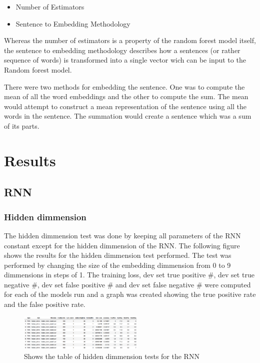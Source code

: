 \documentclass[twoside,twocolumn]{article}
\begin{document}
\begin{itemize}
  \item{Number of Estimators}
  \item{Sentence to Embedding Methodology} 
\end{itemize}

Whereas the number of estimators is a property of the random forest model itself,
the sentence to embedding methodology describes how a sentences (or rather sequence of words)
is transformed into a single vector wich can be input to the Random forest model.

There were two methods for embedding the sentence. One was to compute the mean of all the
word embeddings and the other to compute the sum. The mean would attempt to construct a mean
representation of the sentence using all the words in the sentence. The summation would create
a sentence which was a sum of its parts.


\section{Results}

\subsection{RNN}

\subsubsection{Hidden dimmension}

The hidden dimmension test was done by keeping all parameters of the RNN constant except for the 
hidden dimmension of the RNN. The following figure shows the results for the hidden dimmension
test performed. The test was performed by changing the size of the embedding dimmension from 0 to 9
dimmensions in steps of 1. The training loss, dev set true positive #, dev set true negative #,
dev set false positive # and dev set false negative # were computed for each of the models run 
and a graph was created showing the true positive rate and the false positive rate.

\begin{figure}[H]
\includegraphics[width=6cm]{hidden_dimm_test_table}
\centering
\caption{Shows the table of hidden dimmension tests for the RNN}
\end{figure}
\end{document}
